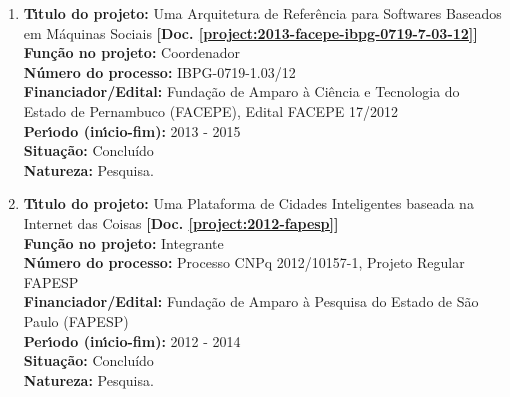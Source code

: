 \documentclass[a4paper,oneside,10pt]{article}
\begin{document}
\begin{enumerate}

\item \textbf{T\'{\i}tulo do projeto:} Uma Arquitetura de Referência para Softwares Baseados em Máquinas Sociais \textbf{[Doc. \ref{project:2013-facepe-ibpg-0719-7-03-12}]}\\
      \textbf{Fun\c{c}\~{a}o no projeto:} Coordenador \\
      \textbf{N\'{u}mero do processo:} IBPG-0719-1.03/12\\
      \textbf{Financiador/Edital:} Fundação de Amparo à Ciência e Tecnologia do Estado de Pernambuco (FACEPE), Edital FACEPE 17/2012\\
      \textbf{Per\'{\i}odo (in\'{\i}cio-fim):} 2013 - 2015 \\
      \textbf{Situação:} Concluído \\
      \textbf{Natureza:} Pesquisa.

\item \textbf{T\'{\i}tulo do projeto:} Uma Plataforma de Cidades Inteligentes baseada na Internet das Coisas \textbf{[Doc. \ref{project:2012-fapesp}]}\\
      \textbf{Fun\c{c}\~{a}o no projeto:} Integrante\\
      \textbf{N\'{u}mero do processo:} Processo CNPq 2012/10157-1, Projeto Regular FAPESP\\
      \textbf{Financiador/Edital:} Fundação de Amparo à Pesquisa do Estado de São Paulo (FAPESP)\\
      \textbf{Per\'{\i}odo (in\'{\i}cio-fim):} 2012 - 2014\\
      \textbf{Situação:} Concluído \\
      \textbf{Natureza:} Pesquisa.


\end{enumerate}
\end{document}
